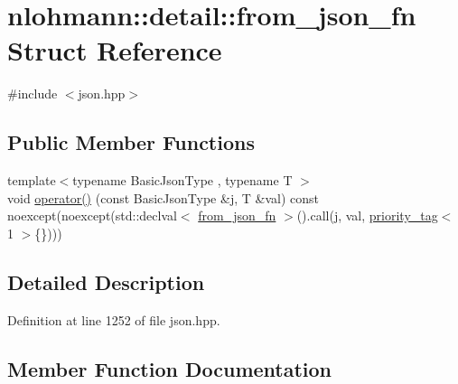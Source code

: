 \hypertarget{structnlohmann_1_1detail_1_1from__json__fn}{}\section{nlohmann\+:\+:detail\+:\+:from\+\_\+json\+\_\+fn Struct Reference}
\label{structnlohmann_1_1detail_1_1from__json__fn}


{\ttfamily \#include $<$json.\+hpp$>$}

\subsection*{Public Member Functions}
\begin{DoxyCompactItemize}
\item 
{\footnotesize template$<$typename Basic\+Json\+Type , typename T $>$ }\\void \hyperlink{structnlohmann_1_1detail_1_1from__json__fn_a40459b61e3df80076963f37055348a86}{operator()} (const Basic\+Json\+Type \&j, T \&val) const noexcept(noexcept(std\+::declval$<$ \hyperlink{structnlohmann_1_1detail_1_1from__json__fn}{from\+\_\+json\+\_\+fn} $>$().call(j, val, \hyperlink{structnlohmann_1_1detail_1_1priority__tag}{priority\+\_\+tag}$<$ 1 $>$\{\})))
\end{DoxyCompactItemize}


\subsection{Detailed Description}


Definition at line 1252 of file json.\+hpp.



\subsection{Member Function Documentation}
